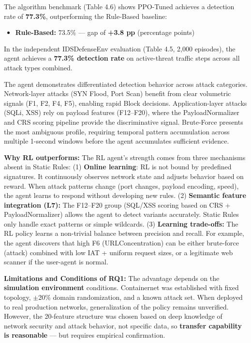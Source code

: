 \documentclass[12pt,a4paper]{report}
\begin{document}
The algorithm benchmark (Table 4.6) shows PPO-Tuned achieves a detection rate of \textbf{77.3\%}, outperforming the Rule-Based baseline:
\begin{itemize}
  \item \textbf{Rule-Based:} 73.5\% --- gap of \textbf{+3.8 pp} (percentage points)
\end{itemize}

In the independent IDSDefenseEnv evaluation (Table 4.5, 2,000 episodes), the agent achieves a \textbf{77.3\% detection rate} on active-threat traffic steps across all attack types combined.

The agent demonstrates differentiated detection behavior across attack categories. Network-layer attacks (SYN Flood, Port Scan) benefit from clear volumetric signals (F1, F2, F4, F5), enabling rapid Block decisions. Application-layer attacks (SQLi, XSS) rely on payload features (F12--F20), where the PayloadNormalizer and CRS scoring pipeline provide the discriminative signal. Brute-Force presents the most ambiguous profile, requiring temporal pattern accumulation across multiple 1-second windows before the agent accumulates sufficient evidence.

\textbf{Why RL outperforms:} The RL agent's strength comes from three mechanisms absent in Static Rules:
(1) \textbf{Online learning}: RL is not bound by predefined signatures. It continuously observes network state and adjusts behavior based on reward. When attack patterns change (port changes, payload encoding, speed), the agent learns to respond without developing new rules.
(2) \textbf{Semantic feature integration (L7):} The F12--F20 group (SQL/XSS scoring based on CRS + PayloadNormalizer) allows the agent to detect variants accurately. Static Rules only handle exact patterns or simple wildcards.
(3) \textbf{Learning trade-offs:} The RL policy learns a non-trivial balance between precision and recall. For example, the agent discovers that high F6 (URLConcentration) can be either brute-force (attack) combined with low IAT + uniform request sizes, or a legitimate web scanner if the user-agent is normal.

\textbf{Limitations and Conditions of RQ1:} The advantage depends on the \textbf{simulation environment} conditions. Containernet was established with fixed topology, $\pm$20\% domain randomization, and a known attack set. When deployed to real production networks, generalization of the policy remains unverified. However, the 20-feature structure was chosen based on deep knowledge of network security and attack behavior, not specific data, so \textbf{transfer capability is reasonable} --- but requires empirical confirmation.
\end{document}
